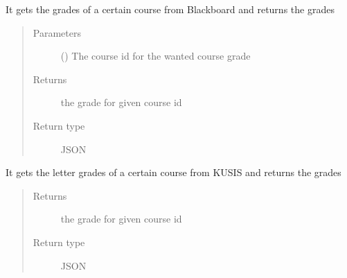 \documentclass[letterpaper,10pt,english]{sphinxmanual}
\begin{document}
\begin{fulllineitems}
\label{\detokenize{main:main.getGrade}}
\pysigstartsignatures
{}
\pysigstopsignatures
\sphinxAtStartPar
It gets the grades of a certain course from Blackboard and returns the grades
\begin{quote}\begin{description}
\item[{Parameters}] \leavevmode
\sphinxAtStartPar
{} () \textendash{} The course id for the wanted course grade

\item[{Returns}] \leavevmode
\sphinxAtStartPar
the grade for given course id

\item[{Return type}] \leavevmode
\sphinxAtStartPar
JSON

\end{description}\end{quote}

\end{fulllineitems}


\begin{fulllineitems}
\label{\detokenize{main:main.getLetterGrades}}
\pysigstartsignatures
{}
\pysigstopsignatures
\sphinxAtStartPar
It gets the letter grades of a certain course from KUSIS and returns the grades
\begin{quote}\begin{description}
\item[{Returns}] \leavevmode
\sphinxAtStartPar
the grade for given course id

\item[{Return type}] \leavevmode
\sphinxAtStartPar
JSON

\end{description}\end{quote}

\end{fulllineitems}

\end{document}
